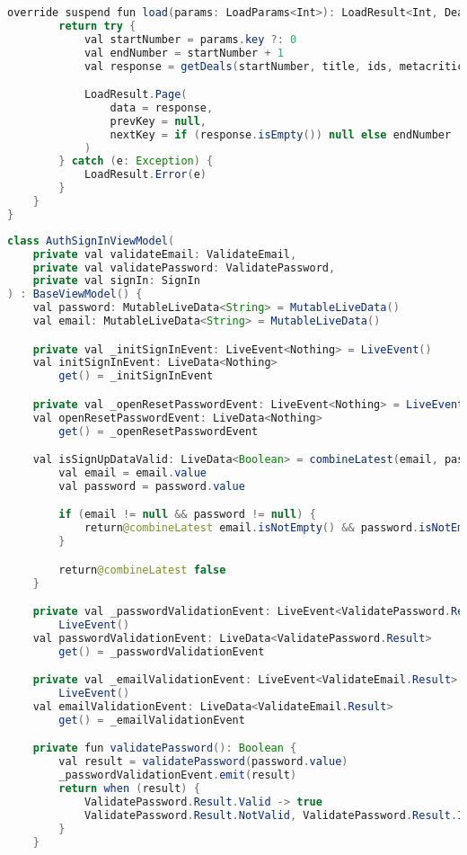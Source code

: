 \begin{asection}
\begin{lstlisting}[language=Java,label={lst:add:a_10}, caption={DealsPagingSource}]
    override suspend fun load(params: LoadParams<Int>): LoadResult<Int, Deal> {
        return try {
            val startNumber = params.key ?: 0
            val endNumber = startNumber + 1
            val response = getDeals(startNumber, title, ids, metacritic)

            LoadResult.Page(
                data = response,
                prevKey = null,
                nextKey = if (response.isEmpty()) null else endNumber
            )
        } catch (e: Exception) {
            LoadResult.Error(e)
        }
    }
}
\end{lstlisting}
\begin{lstlisting}[language=Java,label={lst:add:a_7}, caption={GestureDetectorCompat}]
class AuthSignInViewModel(
    private val validateEmail: ValidateEmail,
    private val validatePassword: ValidatePassword,
    private val signIn: SignIn
) : BaseViewModel() {
    val password: MutableLiveData<String> = MutableLiveData()
    val email: MutableLiveData<String> = MutableLiveData()

    private val _initSignInEvent: LiveEvent<Nothing> = LiveEvent()
    val initSignInEvent: LiveData<Nothing>
        get() = _initSignInEvent

    private val _openResetPasswordEvent: LiveEvent<Nothing> = LiveEvent()
    val openResetPasswordEvent: LiveData<Nothing>
        get() = _openResetPasswordEvent

    val isSignUpDataValid: LiveData<Boolean> = combineLatest(email, password) {
        val email = email.value
        val password = password.value

        if (email != null && password != null) {
            return@combineLatest email.isNotEmpty() && password.isNotEmpty()
        }

        return@combineLatest false
    }

    private val _passwordValidationEvent: LiveEvent<ValidatePassword.Result> =
        LiveEvent()
    val passwordValidationEvent: LiveData<ValidatePassword.Result>
        get() = _passwordValidationEvent

    private val _emailValidationEvent: LiveEvent<ValidateEmail.Result> =
        LiveEvent()
    val emailValidationEvent: LiveData<ValidateEmail.Result>
        get() = _emailValidationEvent

    private fun validatePassword(): Boolean {
        val result = validatePassword(password.value)
        _passwordValidationEvent.emit(result)
        return when (result) {
            ValidatePassword.Result.Valid -> true
            ValidatePassword.Result.NotValid, ValidatePassword.Result.IsEmpty -> false
        }
    }


\end{lstlisting}
\end{asection}
